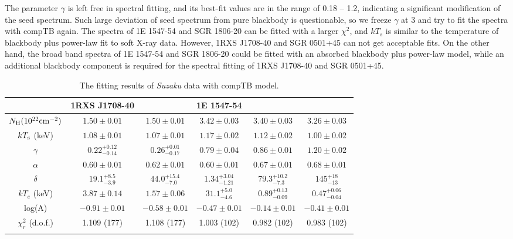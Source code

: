 \documentclass[]{raa}
\begin{document}
The parameter $\gamma$ is left free in spectral fitting, and its best-fit values are in the range of  0.18 -- 1.2, indicating a significant modification of the seed spectrum. 
%
Such large deviation of seed spectrum from pure blackbody is questionable, so we freeze $\gamma$ at 3 and try to fit the spectra with compTB again.
%
The spectra of 1E 1547-54 and SGR 1806-20 can be fitted with a larger $\chi^2$, and $kT_s$ is similar to the temperature of blackbody plus power-law fit to soft X-ray data.
%
However, 1RXS J1708-40 and SGR 0501+45 can not get acceptable fits.
%
On the other hand, the broad band spectra of 1E 1547-54 and SGR 1806-20 could be fitted with an absorbed blackbody plus power-law model, while an additional blackbody component is required for the spectral fitting of 1RXS J1708-40 and SGR 0501+45.


\begin{table}
\bc
\begin{minipage}[]{100mm}
\caption[]{The fitting results of {\it Suzaku}  data with compTB model.   
\label{fit_s}}
\end{minipage}
 \begin{tabular}{cccccc}
  \hline\noalign{\smallskip}
 & 1RXS J1708-40 & & 1E 1547-54 & &  \\
  \hline\noalign{\smallskip}
$N_{\rm H} (10^{22} {\rm cm}^{-2})$ & $1.50 \pm 0.01 $ & $1.50 \pm 0.01$ & $3.42 \pm 0.03$ & $3.40 \pm 0.03$ & $3.26 \pm 0.03$\\
$kT_{\rm s}$ (keV) & $1.08 \pm 0.01$ & $1.07 \pm 0.01$ & $1.17 \pm 0.02$ & $1.12 \pm 0.02$ & $1.00 \pm 0.02$  \\
$\gamma$ & $0.22_{-0.14}^{+0.12}$ & $0.26_{-0.17}^{+0.01}$ & $0.79 \pm 0.04$  & $0.86 \pm 0.01$ & $1.20 \pm 0.02$ \\
$\alpha$ & $0.60 \pm 0.01$ & $0.62 \pm 0.01$  & $0.60 \pm 0.01$ & $0.67 \pm 0.01$ & $0.68 \pm 0.01$ \\ 
$\delta$ & $19.1_{-3.9}^{+8.5}$ & $44.0_{-7.0}^{+15.4}$ & $1.34_{-1.21}^{+3.04}$ & $79.3_{-7.3}^{+10.2}$ & $145_{-13}^{+18}$ \\
$kT_e$ (keV) & $3.87 \pm 0.14$ & $1.57 \pm 0.06$ & $31.1_{-4.6}^{+5.0}$ & $0.89_{-0.09}^{+0.13}$ & $0.47_{-0.04}^{+0.06}$ \\
log(A) & $-0.91 \pm 0.01$ & $-0.58 \pm 0.01$ & $-0.47 \pm 0.01$ & $-0.14 \pm 0.01$ & $-0.41 \pm 0.01$ \\
$\chi_r^2$ (d.o.f.) & 1.109 (177) & 1.108 (177)  & 1.003 (102) & 0.982 (102) & 0.983 (102) \\
  \noalign{\smallskip}\hline
  

\end{tabular}
\end{table}
\end{document}
